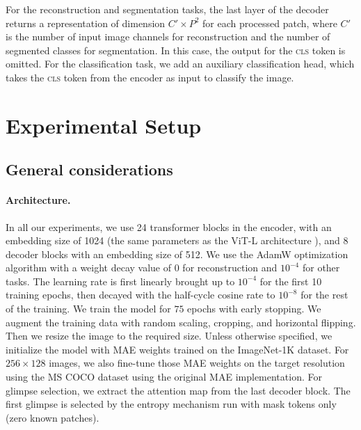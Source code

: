 \documentclass{article}
\begin{document}
For the reconstruction and segmentation tasks, the last layer of the decoder returns a representation of dimension $C' \times P^2$ for each processed patch, where $C'$ is the number of input image channels for reconstruction and the number of segmented classes for segmentation. In this case, the output for the \textsc{cls} token is omitted. For the classification task, we add an auxiliary classification head, which takes the \textsc{cls} token from the encoder as input to classify the image.

\section{Experimental Setup}
\label{sec:setup}

\subsection{General considerations}

\paragraph{Architecture.} In all our experiments, we use 24 transformer blocks in the encoder, with an embedding size of 1024 (the same parameters as the ViT-L architecture \cite{dosovitskiy2020image}), and 8 decoder blocks with an embedding size of 512. We use the AdamW optimization algorithm \cite{loshchilov2018decoupled} with a weight decay value of 0 for reconstruction and $10^{-4}$ for other tasks. The learning rate is first linearly brought up to $10^{-4}$ for the first 10 training epochs, then decayed with the half-cycle cosine rate to $10^{-8}$ for the rest of the training. We train the model for $75$ epochs with early stopping. We augment the training data with random scaling, cropping, and horizontal flipping. Then we resize the image to the required size. Unless otherwise specified, we initialize the model with MAE \cite{he2022masked} weights trained on the ImageNet-1K \cite{deng2009imagenet} dataset. For $256\times128$ images, we also fine-tune those MAE weights on the target resolution using the MS COCO dataset \cite{lin2014microsoft} using the original MAE implementation. For glimpse selection, we extract the attention map from the last decoder block. The first glimpse is selected by the entropy mechanism run with mask tokens only (zero known patches).
\end{document}
